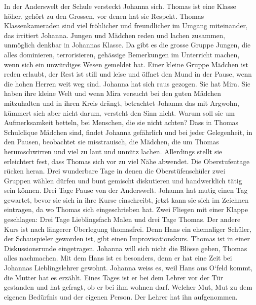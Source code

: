 In der Anderswelt der Schule versteckt Johanna sich. Thomas ist eine Klasse höher, gehört zu den Grossen, vor denen hat sie Respekt. Thomas Klassenkameraden sind viel fröhlicher und freundlicher im Umgang miteinander, das irritiert Johanna. Jungen und Mädchen reden und lachen zusammen, unmöglich denkbar in Johannas Klasse. Da gibt es die grosse Gruppe Jungen, die alles dominieren, terrorisieren, gehässige Bemerkungen im Unterricht machen, wenn sich ein unwürdiges Wesen gemeldet hat. Einer kleine Gruppe Mädchen ist reden erlaubt, der Rest ist still und leise und öffnet den Mund in der Pause, wenn die hohen Herren weit weg sind. Johanna hat sich raus gezogen. Sie hat Mira. Sie haben ihre kleine Welt und wenn Mira versucht bei den guten Mädchen mitzuhalten und in ihren Kreis drängt, betrachtet Johanna das mit Argwohn, kümmert sich aber nicht darum, versteht den Sinn nicht. Warum soll sie um Aufmerksamkeit betteln, bei Menschen, die sie nicht achten?
 Dass in Thomas Schulclique Mädchen sind, findet Johanna gefährlich und bei jeder Gelegenheit, in den Pausen, beobachtet sie misstrauisch, die Mädchen, die um Thomas herumschwirren und viel zu laut und unnütz lachen. Allerdings stellt sie erleichtert fest, dass Thomas sich vor zu viel Nähe abwendet. 
Die Oberstufentage rücken heran. Drei wunderbare Tage in denen die Oberstüfenschüler zwei Gruppen wählen dürfen und bunt gemischt diskutieren und handwerklich tätig sein können. Drei Tage Pause von der Anderswelt. Johanna hat mutig einen Tag gewartet, bevor sie sich in ihre Kurse einschreibt, jetzt kann sie sich im Zeichnen eintragen, da wo Thomas sich eingeschrieben hat. Zwei Fliegen mit einer Klappe geschlagen: Drei Tage Lieblingsfach Malen und drei Tage Thomas.
Der andere Kurs ist nach längerer Überlegung thomasfrei. Denn Hans ein ehemaliger Schüler, der Schauspieler geworden ist, gibt einen Improvisationskurs. Thomas ist in einer Diskussionsrunde eingetragen. Johanna will sich nicht die Blösse geben, Thomas alles nachmachen. 
Mit dem Hans ist es besonders, denn er hat eine Zeit bei Johannas Lieblingslehrer gewohnt. Johanna weiss es, weil Hans aus O`feld kommt, die Mutter hat es erzählt. Eines Tages ist er bei dem Lehrer vor der Tür gestanden und hat gefragt, ob er bei ihm wohnen darf. Welcher Mut, Mut zu dem eigenen Bedürfnis und der eigenen Person. Der Lehrer hat ihn aufgenommen. 
